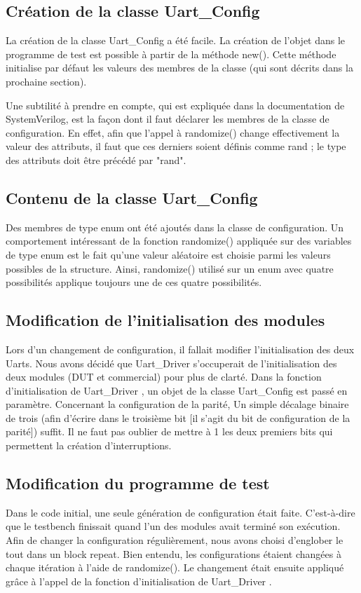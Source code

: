 \documentclass[12pt, titlepage]{article}
\newcommand{\udriver}{Uart\_Driver }
\newcommand{\uconfig}{Uart\_Config }
\begin{document}
    \subsection{Création de la classe \uconfig} 
    La création de la classe \uconfig a été facile. La création de l'objet dans le programme de test est possible à partir de la méthode new(). Cette méthode initialise par défaut les valeurs des membres de la classe (qui sont décrits dans la prochaine section).

    Une subtilité à prendre en compte, qui est expliquée dans la documentation de SystemVerilog, est la façon dont il faut déclarer les membres de la classe de configuration. En effet, afin que l'appel à randomize() change effectivement la valeur des attributs, il faut que ces derniers soient définis comme rand ; le type des attributs doit être précédé par "rand".
    
    \subsection{Contenu de la classe \uconfig}
    Des membres de type enum ont été ajoutés dans la classe de configuration. Un comportement intéressant de la fonction randomize() appliquée sur des variables de type enum est le fait qu'une valeur aléatoire est choisie parmi les valeurs possibles de la structure. Ainsi, randomize() utilisé sur un enum avec quatre possibilités applique toujours une de ces quatre possibilités.
    
    \subsection{Modification de l'initialisation des modules} 
    Lors d'un changement de configuration, il fallait modifier l'initialisation des deux Uarts. Nous avons décidé que \udriver s'occuperait de l'initialisation des deux modules (DUT et commercial) pour plus de clarté. Dans la fonction d'initialisation de \udriver, un objet de la classe \uconfig est passé en paramètre. Concernant la configuration de la parité, Un simple décalage binaire de trois (afin d'écrire dans le troisième bit [il s'agit du bit de configuration de la parité]) suffit. Il ne faut pas oublier de mettre à 1 les deux premiers bits qui permettent la création d'interruptions.

    
    \subsection{Modification du programme de test}
    Dans le code initial, une seule génération de configuration était faite. C'est-à-dire que le testbench finissait quand l'un des modules avait terminé son exécution. Afin de changer la configuration régulièrement, nous avons choisi d'englober le tout dans un block repeat. Bien entendu, les configurations étaient changées à chaque itération à l'aide de randomize(). Le changement était ensuite appliqué grâce à l'appel de la fonction d'initialisation de \udriver.
\end{document}
